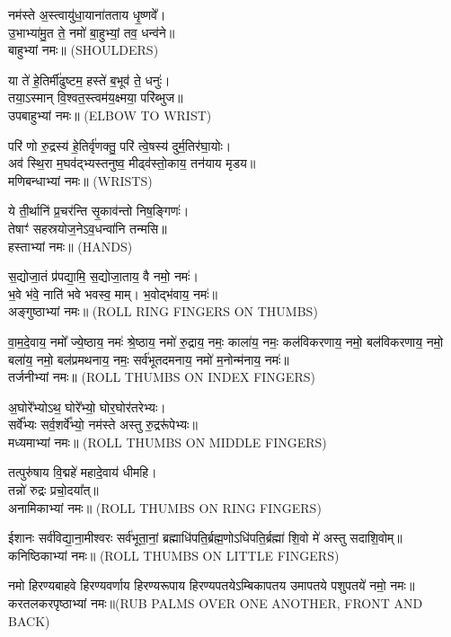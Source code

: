 नम॑स्ते अ॒स्त्वायु॑धा॒याना॑तताय धृ॒ष्णवे᳚।\\
 उ॒भाभ्या॑मु॒त ते॒ नमो॑ बा॒हुभ्यां॒ तव॒ धन्व॑ने॥\\
बाहुभ्यां नमः॥ {\scriptsize (SHOULDERS)}


 या ते॑ हे॒तिर्मी॑ढुष्टम॒ हस्ते॑ ब॒भूव॑ ते॒ धनुः॑।\\
 तया॒ऽस्मान् वि॒श्वत॒स्त्वम॑य॒क्ष्मया॒ परि॑ब्भुज॥\\
उपबाहुभ्यां नमः॥ {\scriptsize (ELBOW TO WRIST)}

परि॑ णो रु॒द्रस्य॑ हे॒तिर्वृ॑णक्तु॒ परि॑ त्वे॒षस्य॑ दुर्म॒तिर॑घा॒योः।\\
 अव॑ स्थि॒रा म॒घव॑द्भ्यस्तनुष्व॒ मीढ्व॑स्तो॒काय॒ तन॑याय मृडय॥\\
मणिबन्धाभ्यां नमः॥ {\scriptsize (WRISTS)}

 ये ती॒र्थानि॑ प्र॒चर॑न्ति सृ॒काव॑न्तो निष॒ङ्गिणः॑।\\
 तेषाꣳ॑ सहस्रयोज॒नेऽव॒धन्वा॑नि तन्मसि॥\\
हस्ताभ्यां नमः॥ {\scriptsize (HANDS)}


स॒द्योजा॒तं प्र॑पद्या॒मि॒ स॒द्योजा॒ताय॒ वै नमो॒ नमः॑।\\
भ॒वे भ॑वे॒ नाति॑ भवे भवस्व॒ माम्। भ॒वोद्भ॑वाय॒ नमः॑॥ \\
अङ्गुष्ठाभ्यां नमः॥ {\scriptsize (ROLL RING FINGERS ON THUMBS)}

वा॒म॒दे॒वाय॒ नमो᳚ ज्ये॒ष्ठाय॒ नमः॑ श्रे॒ष्ठाय॒ नमो॑ रु॒द्राय॒ नमः॒ काला॑य॒ नमः॒ कल॑विकरणाय॒ नमो॒ बल॑विकरणाय॒ नमो॒ बला॑य॒ नमो॒ बल॑प्रमथनाय॒ नमः॒ सर्व॑भूतदमनाय॒ नमो॑ म॒नोन्म॑नाय॒ नमः॑॥\\
तर्जनीभ्यां नमः॥ {\scriptsize (ROLL THUMBS ON INDEX FINGERS)}

अ॒घोरे᳚भ्योऽथ॒ घोरे᳚भ्यो॒ घोर॒घोर॑तरेभ्यः।\\
सर्वे᳚भ्यः सर्व॒शर्वे᳚भ्यो॒ नम॑स्ते अस्तु रु॒द्ररू॑पेभ्यः॥\\
मध्यमाभ्यां नमः॥ {\scriptsize (ROLL THUMBS ON MIDDLE FINGERS)}

तत्पुरु॑षाय वि॒द्महे॑ महादे॒वाय॑ धीमहि।\\
तन्नो॑ रुद्रः प्रचो॒दया᳚त्॥\\
अनामिकाभ्यां नमः॥ {\scriptsize (ROLL THUMBS ON RING FINGERS)}

ईशानः सर्व॑विद्या॒ना॒मीश्वरः सर्व॑भूता॒नां॒ ब्रह्माधि॑पति॒र्ब्रह्म॒णो\-ऽधि॑पति॒र्ब्रह्मा॑ शि॒वो मे॑ अस्तु सदाशि॒वोम्॥\\
कनिष्ठिकाभ्यां नमः॥ {\scriptsize (ROLL THUMBS ON LITTLE FINGERS)}

नमो हिरण्यबाहवे हिरण्यवर्णाय हिरण्यरूपाय हिरण्यपतये\-ऽम्बिकापतय उमापतये पशुपतये॑ नमो॒ नमः॥\\
करतलकरपृष्ठाभ्यां नमः॥{\scriptsize (RUB PALMS OVER ONE ANOTHER, FRONT AND BACK)}

